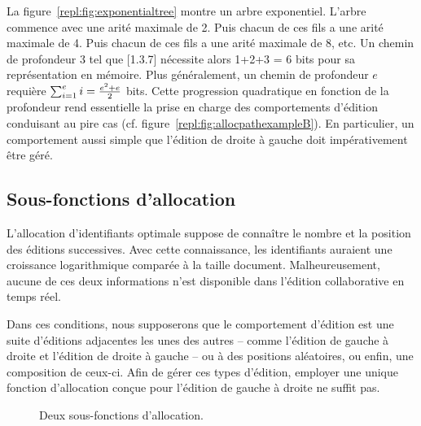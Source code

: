 La figure~\ref{repl:fig:exponentialtree} montre un arbre exponentiel. L'arbre
commence avec une arité maximale de 2. Puis chacun de ces fils a une arité
maximale de 4. Puis chacun de ces fils a une arité maximale de 8, etc. Un chemin
de profondeur 3 tel que [1.3.7] nécessite alors 1+2+3 = 6 bits pour sa
représentation en mémoire.  Plus généralement, un chemin de profondeur $e$
requière $\textstyle\sum\nolimits_{i=1}^{e}i = {e^2 + e \over{2}}$ bits. Cette
progression quadratique en fonction de la profondeur rend essentielle la prise
en charge des comportements d'édition conduisant au pire cas
(cf. figure~\ref{repl:fig:allocpathexampleB}). En particulier, un comportement
aussi simple que l'édition de droite à gauche doit impérativement être géré.

\subsection{Sous-fonctions d'allocation}
\label{repl:subsec:suballocation}

L'allocation d'identifiants optimale suppose de connaître le nombre et la
position des éditions successives. Avec cette connaissance, les identifiants
auraient une croissance logarithmique comparée à la taille
document. Malheureusement, aucune de ces deux informations n'est disponible dans
l'édition collaborative en temps réel.

Dans ces conditions, nous supposerons que le comportement d'édition est une
suite d'éditions adjacentes les unes des autres -- comme l'édition de gauche à
droite et l'édition de droite à gauche -- ou à des positions aléatoires, ou
enfin, une composition de ceux-ci. Afin de gérer ces types d'édition, employer
une unique fonction d'allocation conçue pour l'édition de gauche à droite ne
suffit pas.

\begin{figure}
  \begin{center}
    \hspace{20pt}
    \caption[Deux sous-fonctions d'allocation]
    {\label{repl:fig:suballocation}Deux sous-fonctions d'allocation.}
  \end{center}
\end{figure}

